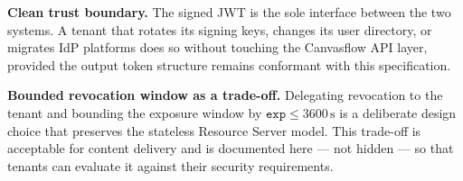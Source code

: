 \textbf{Clean trust boundary.} The signed JWT is the sole interface between the two
systems. A tenant that rotates its signing keys, changes its user directory, or migrates
IdP platforms does so without touching the Canvasflow API layer, provided the output
token structure remains conformant with this specification.

\textbf{Bounded revocation window as a trade-off.} Delegating revocation to the tenant
and bounding the exposure window by $\texttt{exp} \leq 3600\,\mathrm{s}$ is a deliberate
design choice that preserves the stateless Resource Server model. This trade-off is
acceptable for content delivery and is documented here --- not hidden --- so that tenants
can evaluate it against their security requirements.